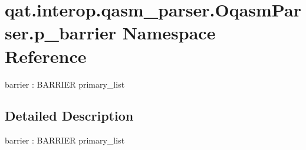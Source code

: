 \hypertarget{namespaceqat_1_1interop_1_1qasm__parser_1_1OqasmParser_1_1p__barrier}{\section{qat.\-interop.\-qasm\-\_\-parser.\-Oqasm\-Parser.\-p\-\_\-barrier Namespace Reference}
\label{namespaceqat_1_1interop_1_1qasm__parser_1_1OqasmParser_1_1p__barrier}
}


barrier \-: B\-A\-R\-R\-I\-E\-R primary\-\_\-list  




\subsection{Detailed Description}
barrier \-: B\-A\-R\-R\-I\-E\-R primary\-\_\-list 